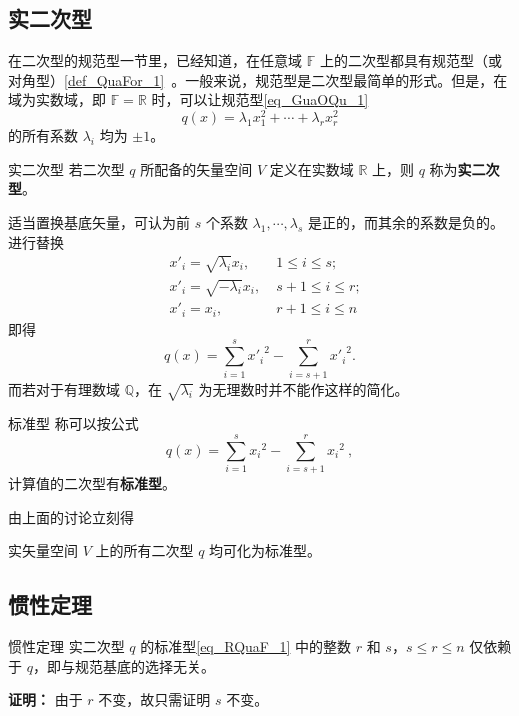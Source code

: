 

\subsection{实二次型}
在二次型的规范型一节里，已经知道，在任意域 $\mathbb F$ 上的二次型都具有规范型（或对角型）\autoref{def_QuaFor_1}~。一般来说，规范型是二次型最简单的形式。但是，在域为实数域，即 $\mathbb F=\mathbb R$ 时，可以让规范型\autoref{eq_GuaOQu_1}~
\begin{equation}
q({x})=\lambda_1 x_1^2+\cdots+\lambda_r x_r^2
\end{equation}
的所有系数 $\lambda_i$ 均为 $\pm 1$。
\begin{definition}{实二次型}
若二次型 $q$ 所配备的矢量空间 $V$ 定义在实数域 $\mathbb R$ 上，则 $q$ 称为\textbf{实二次型}。
\end{definition}
适当置换基底矢量，可认为前 $s$ 个系数 $\lambda_1,\cdots,\lambda_s$ 是正的，而其余的系数是负的。进行替换
\begin{equation}
\begin{aligned}
&x'_i=\sqrt{\lambda_i}x_i,\;&1\leq i\leq s;\\
&x'_i=\sqrt{-\lambda_i}x_i,\;&s+1\leq i\leq r;\\
&x'_i=x_i,\; &r+1\leq i\leq n
\end{aligned}
\end{equation}
 即得
 \begin{equation}
 q({x})=\sum_{i=1}^{s}{x'_i}^2-\sum_{i=s+1}^{r} {x'_{i}}^{2}.
 \end{equation}
 而若对于有理数域 $\mathbb Q$，在 $\sqrt{\lambda_i}$ 为无理数时并不能作这样的简化。
 
\begin{definition}{标准型}
称可以按公式
\begin{equation}\label{eq_RQuaF_1}
q( x)=\sum_{i=1}^{s}{x_i}^2-\sum_{i=s+1}^{r} {x_{i}}^{2}~,
\end{equation}
计算值的二次型有\textbf{标准型}。
\end{definition}
由上面的讨论立刻得
\begin{theorem}{}\label{the_RQuaF_1}
实矢量空间 $V$ 上的所有二次型 $q$ 均可化为标准型。
\end{theorem}
\subsection{惯性定理}
\begin{theorem}{惯性定理}
实二次型 $q$ 的标准型\autoref{eq_RQuaF_1} 中的整数 $r$ 和 $s$，$s\leq r\leq n$ 仅依赖于 $q$，即与规范基底的选择无关。
\end{theorem}
\textbf{证明：} 由于 $r$ 不变，故只需证明 $s$ 不变。

